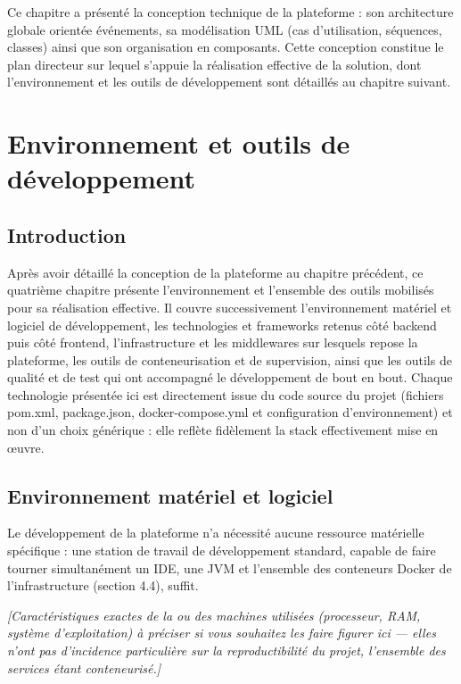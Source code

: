 \documentclass[12pt,a4paper]{report}
\newcommand{\placeholder}[1]{\par\smallskip\noindent\textcolor{placeholderred}{\itshape [#1]}\par\smallskip}
\begin{document}
Ce chapitre a présenté la conception technique de la plateforme : son architecture globale orientée événements, sa modélisation UML (cas d'utilisation, séquences, classes) ainsi que son organisation en composants. Cette conception constitue le plan directeur sur lequel s'appuie la réalisation effective de la solution, dont l'environnement et les outils de développement sont détaillés au chapitre suivant.

\chapter{Environnement et outils de développement}

\section*{Introduction}

Après avoir détaillé la conception de la plateforme au chapitre précédent, ce quatrième chapitre présente l'environnement et l'ensemble des outils mobilisés pour sa réalisation effective. Il couvre successivement l'environnement matériel et logiciel de développement, les technologies et frameworks retenus côté backend puis côté frontend, l'infrastructure et les middlewares sur lesquels repose la plateforme, les outils de conteneurisation et de supervision, ainsi que les outils de qualité et de test qui ont accompagné le développement de bout en bout. Chaque technologie présentée ici est directement issue du code source du projet (fichiers pom.xml, package.json, docker-compose.yml et configuration d'environnement) et non d'un choix générique : elle reflète fidèlement la stack effectivement mise en \oe uvre.

\section{Environnement matériel et logiciel}

Le développement de la plateforme n'a nécessité aucune ressource matérielle spécifique : une station de travail de développement standard, capable de faire tourner simultanément un IDE, une JVM et l'ensemble des conteneurs Docker de l'infrastructure (section 4.4), suffit.

\placeholder{Caractéristiques exactes de la ou des machines utilisées (processeur, RAM, système d'exploitation) à préciser si vous souhaitez les faire figurer ici --- elles n'ont pas d'incidence particulière sur la reproductibilité du projet, l'ensemble des services étant conteneurisé.}
\end{document}
